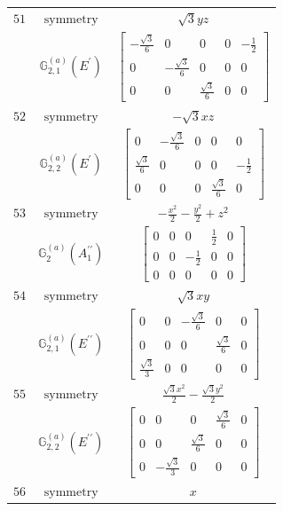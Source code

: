 \documentclass[fleqn,8pt,landscape]{jsarticle}
\begin{document}
\begin{longtable}{ccc}
$ 51 $ & $ \text{symmetry} $ & $ \sqrt{3} y z $ \\
$  $ & $ \mathbb{G}_{2,1}^{(a)}(E^{\prime}) $ & $ \begin{bmatrix} - \frac{\sqrt{3}}{6} & 0 & 0 & 0 & - \frac{1}{2} \\ 0 & - \frac{\sqrt{3}}{6} & 0 & 0 & 0 \\ 0 & 0 & \frac{\sqrt{3}}{6} & 0 & 0 \end{bmatrix} $ \\ \hline
$ 52 $ & $ \text{symmetry} $ & $ - \sqrt{3} x z $ \\
$  $ & $ \mathbb{G}_{2,2}^{(a)}(E^{\prime}) $ & $ \begin{bmatrix} 0 & - \frac{\sqrt{3}}{6} & 0 & 0 & 0 \\ \frac{\sqrt{3}}{6} & 0 & 0 & 0 & - \frac{1}{2} \\ 0 & 0 & 0 & \frac{\sqrt{3}}{6} & 0 \end{bmatrix} $ \\ \hline
$ 53 $ & $ \text{symmetry} $ & $ - \frac{x^{2}}{2} - \frac{y^{2}}{2} + z^{2} $ \\
$  $ & $ \mathbb{G}_{2}^{(a)}(A_{1}^{\prime\prime}) $ & $ \begin{bmatrix} 0 & 0 & 0 & \frac{1}{2} & 0 \\ 0 & 0 & - \frac{1}{2} & 0 & 0 \\ 0 & 0 & 0 & 0 & 0 \end{bmatrix} $ \\ \hline
$ 54 $ & $ \text{symmetry} $ & $ \sqrt{3} x y $ \\
$  $ & $ \mathbb{G}_{2,1}^{(a)}(E^{\prime\prime}) $ & $ \begin{bmatrix} 0 & 0 & - \frac{\sqrt{3}}{6} & 0 & 0 \\ 0 & 0 & 0 & \frac{\sqrt{3}}{6} & 0 \\ \frac{\sqrt{3}}{3} & 0 & 0 & 0 & 0 \end{bmatrix} $ \\ \hline
$ 55 $ & $ \text{symmetry} $ & $ \frac{\sqrt{3} x^{2}}{2} - \frac{\sqrt{3} y^{2}}{2} $ \\
$  $ & $ \mathbb{G}_{2,2}^{(a)}(E^{\prime\prime}) $ & $ \begin{bmatrix} 0 & 0 & 0 & \frac{\sqrt{3}}{6} & 0 \\ 0 & 0 & \frac{\sqrt{3}}{6} & 0 & 0 \\ 0 & - \frac{\sqrt{3}}{3} & 0 & 0 & 0 \end{bmatrix} $ \\ \hline
$ 56 $ & $ \text{symmetry} $ & $ x $ \\

\end{longtable}
\end{document}
